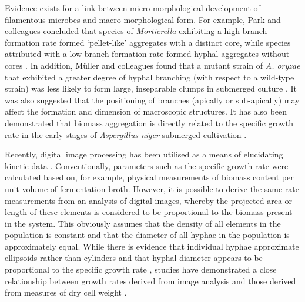 Evidence exists for a link between micro-morphological development of filamentous microbes and macro-morphological form. For example, Park and colleagues concluded that species of \emph{Mortierella} exhibiting a high branch formation rate formed \lq pellet-like' aggregates with a distinct core, while species attributed with a low branch formation rate formed hyphal aggregates without cores \cite{eypark2006}. In addition, M\"{u}ller and colleagues found that a mutant strain of \emph{A. oryzae} that exhibited a greater degree of hyphal branching (with respect to a wild-type strain) was less likely to form large, inseparable clumps in submerged culture \cite{muller2002}. It was also suggested that the positioning of branches (apically or sub-apically) may affect the formation and dimension of macroscopic structures. It has also been demonstrated that biomass aggregation is directly related to the specific growth rate in the early stages of \emph{Aspergillus niger} submerged cultivation \cite{grimm2004, grimm2005a}.

Recently, digital image processing has been utilised as a means of elucidating kinetic data \cite{carlsen1996a, spohr1997, agger1998, spohr1998, christiansen1999, muller2002, lubbehusen2003, bizukojc2006, eypark2006, pollack2008, cross2004, couri2006, rahardjo2005b}. Conventionally, parameters such as the specific growth rate were calculated based on, for example, physical measurements of biomass content per unit volume of fermentation broth. However, it is possible to derive the same rate measurements from an analysis of digital images, whereby the projected area or length of these elements is considered to be proportional to the biomass present in the system. This obviously assumes that the density of all elements in the population is constant and that the diameter of all hyphae in the population is approximately equal. While there is evidence that individual hyphae approximate ellipsoids rather than cylinders \cite{dieguez-uribeondo2004} and that hyphal diameter appears to be proportional to the specific growth rate \cite{agger1998, pollack2008}, studies have demonstrated a close relationship between growth rates derived from image analysis and those derived from measures of dry cell weight \cite{carlsen1996a, spohr1997}.

